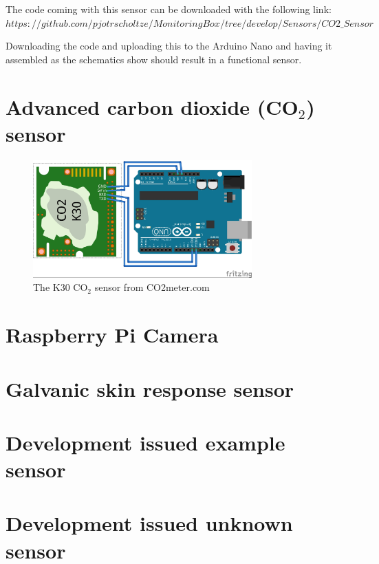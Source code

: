 \documentclass{report}
\begin{document}
The code coming with this sensor can be downloaded with the following link: $ https://github.com/pjotrscholtze/MonitoringBox/tree/develop/Sensors/CO2\_Sensor $


Downloading the code and uploading this to the Arduino Nano and having it assembled as the schematics show should result in a functional sensor. 

\chapter{Advanced carbon dioxide (CO$_2$) sensor}

\begin{figure}[H]
	\centering
\includegraphics[width=0.75\textwidth]{images/K30-gas-sensor-schematic.jpg} 
	\caption{The K30 CO$_2$ sensor from  CO2meter.com}
\end{figure}

\chapter{Raspberry Pi Camera}

\chapter{Galvanic skin response sensor}

\chapter{Development issued example sensor}

\chapter{Development issued unknown sensor}
\end{document}
